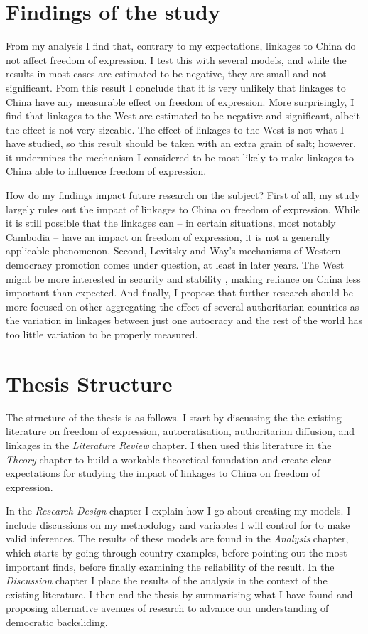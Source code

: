 \section{Findings of the study}
From my analysis I find that, contrary to my expectations, linkages to China do not affect freedom of expression. I test this with several models, and while the results in most cases are estimated to be negative, they are small and not significant. From this result I conclude that it is very unlikely that linkages to China have any measurable effect on freedom of expression. More surprisingly, I find that linkages to the West are estimated to be negative and significant, albeit the effect is not very sizeable. The effect of linkages to the West is not what I have studied, so this result should be taken with an extra grain of salt; however, it undermines the mechanism I considered to be most likely to make linkages to China able to influence freedom of expression.

How do my findings impact future research on the subject? First of all, my study largely rules out the impact of linkages to China on freedom of expression. While it is still possible that the linkages can -- in certain situations, most notably Cambodia -- have an impact on freedom of expression, it is not a generally applicable phenomenon. Second, Levitsky and Way's \citeyear{levitsky_linkage_2006} mechanisms of Western democracy promotion comes under question, at least in later years. The West might be more interested in security and stability \citep{borzel_noble_2015, delcour_spoiler_2015, freyburg_local_2015}, making reliance on China less important than expected. And finally, I propose that further research should be more focused on other aggregating the effect of several authoritarian countries as the variation in linkages between just one autocracy and the rest of the world has too little variation to be properly measured.

\section{Thesis Structure}
The structure of the thesis is as follows. I start by discussing the the existing literature on freedom of expression, autocratisation, authoritarian diffusion, and linkages in the \textit{Literature Review} chapter. I then used this literature in the \textit{Theory} chapter to build a workable theoretical foundation and create clear expectations for studying the impact of linkages to China on freedom of expression.

In the \textit{Research Design} chapter I explain how I go about creating my models. I include discussions on my methodology and variables I will control for to make valid inferences. The results of these models are found in the \textit{Analysis} chapter, which starts by going through country examples, before pointing out the most important finds, before finally examining the reliability of the result. In the \textit{Discussion} chapter I place the results of the analysis in the context of the existing literature. I then end the thesis by summarising what I have found and proposing alternative avenues of research to advance our understanding of democratic backsliding.

